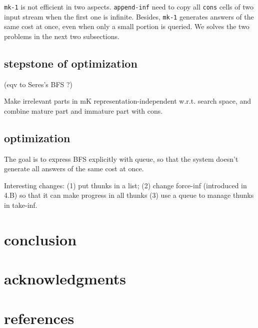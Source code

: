 \documentclass[format=acmlarge, review=true, authordraft=true]{acmart}
\begin{document}
\texttt{mk-1} is not efficient in two aspects. \texttt{append-inf} need to copy all \texttt{cons} cells of two input stream when the first one is infinite. Besides, \texttt{mk-1} generates answers of the same cost at once, even when only a small portion is queried. We solves the two problems in the next two subsections.

\subsection{stepstone of optimization}

(eqv to Seres's BFS ?)

Make irrelevant parts in mK representation-independent w.r.t. search space, and combine mature part and immature part with cons.

\subsection{optimization}

The goal is to express BFS explicitly with queue, so that the system doesn't generate all answers of the same cost at once.

Interesting changes: (1) put thunks in a list; (2) change force-inf (introduced in 4.B) so that it can make progress in all thunks (3) use a queue to manage thunks in take-inf.

\section{conclusion}

\section*{acknowledgments}

\section*{references}
\end{document}
